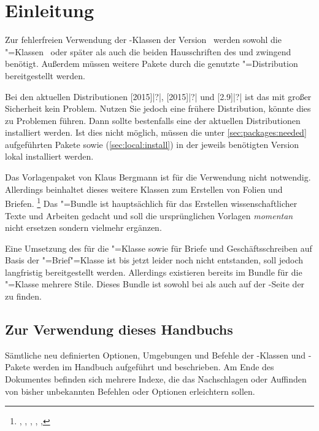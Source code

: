 \chapter{Einleitung}
%
Zur fehlerfreien Verwendung der \TUDScript-Klassen der Version~\vTUDScript{} 
werden sowohl die \KOMAScript"=Klassen~\vKOMAScript{} oder später als auch die 
beiden Hausschriften des \CDs \Univers und \DIN zwingend benötigt. Außerdem 
müssen weitere Pakete durch die genutzte "=Distribution 
bereitgestellt werden. 

Bei den aktuellen Distributionen
%
[2015]|?|,
[2015]|?| und 
[2.9]|?|
ist das mit großer Sicherheit kein Problem. Nutzen Sie jedoch eine frühere 
Distribution, könnte dies zu Problemen führen. Dann sollte bestenfalls eine der 
aktuellen Distributionen installiert werden. Ist dies nicht möglich, müssen die 
unter \autoref{sec:packages:needed} aufgeführten Pakete sowie \TUDScript 
(\autoref{sec:local:install}) in der jeweils benötigten Version lokal 
installiert werden.

Das Vorlagenpaket von Klaus Bergmann ist für die Verwendung nicht notwendig. 
Allerdings beinhaltet dieses weitere Klassen zum Erstellen von Folien 
und Briefen.%
\footnote{%
  , , , , 
  , 
}
Das \TUDScript"=Bundle ist hauptsächlich für das Erstellen wissenschaftlicher 
Texte und Arbeiten gedacht und soll die ursprünglichen Vorlagen \emph{momentan} 
nicht ersetzen sondern vielmehr ergänzen. 

Eine Umsetzung des \CDs für die "=Klasse sowie für Briefe und 
Geschäftsschreiben auf Basis der \KOMAScript"=Brief"=Klasse  
ist bis jetzt leider noch nicht entstanden, soll jedoch langfristig 
bereitgestellt werden. Allerdings existieren bereits im Bundle 
 für die "=Klasse mehrere Stile. Dieses 
Bundle ist sowohl bei  als 
auch auf der  
{-Seite der \TnUD} zu finden.



\section{Zur Verwendung dieses Handbuchs}
Sämtliche neu definierten Optionen, Umgebungen und Befehle der 
\TUDScript-Klassen und \TUDScript-Pakete werden im Handbuch aufgeführt und 
beschrieben. Am Ende des Dokumentes befinden sich mehrere Indexe, die das 
Nachschlagen oder Auffinden von bisher unbekannten Befehlen oder Optionen 
erleichtern sollen.

